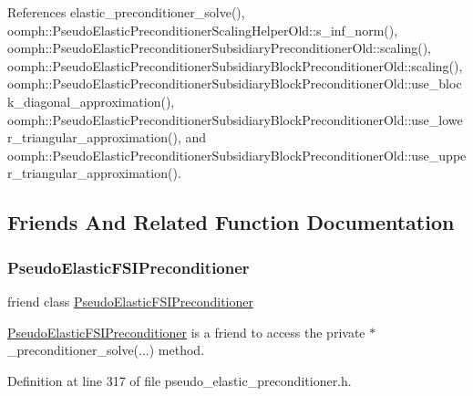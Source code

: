 References elastic\+\_\+preconditioner\+\_\+solve(), oomph\+::\+Pseudo\+Elastic\+Preconditioner\+Scaling\+Helper\+Old\+::s\+\_\+inf\+\_\+norm(), oomph\+::\+Pseudo\+Elastic\+Preconditioner\+Subsidiary\+Preconditioner\+Old\+::scaling(), oomph\+::\+Pseudo\+Elastic\+Preconditioner\+Subsidiary\+Block\+Preconditioner\+Old\+::scaling(), oomph\+::\+Pseudo\+Elastic\+Preconditioner\+Subsidiary\+Block\+Preconditioner\+Old\+::use\+\_\+block\+\_\+diagonal\+\_\+approximation(), oomph\+::\+Pseudo\+Elastic\+Preconditioner\+Subsidiary\+Block\+Preconditioner\+Old\+::use\+\_\+lower\+\_\+triangular\+\_\+approximation(), and oomph\+::\+Pseudo\+Elastic\+Preconditioner\+Subsidiary\+Block\+Preconditioner\+Old\+::use\+\_\+upper\+\_\+triangular\+\_\+approximation().



\subsection{Friends And Related Function Documentation}
\mbox{\label{classoomph_1_1PseudoElasticPreconditionerOld_aaaea2b4795566f81945597254305249d}} 
\subsubsection{\texorpdfstring{Pseudo\+Elastic\+F\+S\+I\+Preconditioner}{PseudoElasticFSIPreconditioner}}
{\footnotesize\ttfamily friend class \hyperlink{classoomph_1_1PseudoElasticFSIPreconditioner}{Pseudo\+Elastic\+F\+S\+I\+Preconditioner}\hspace{0.3cm}{\ttfamily [friend]}}



\hyperlink{classoomph_1_1PseudoElasticFSIPreconditioner}{Pseudo\+Elastic\+F\+S\+I\+Preconditioner} is a friend to access the private $\ast$\+\_\+preconditioner\+\_\+solve(...) method. 



Definition at line 317 of file pseudo\+\_\+elastic\+\_\+preconditioner.\+h.



